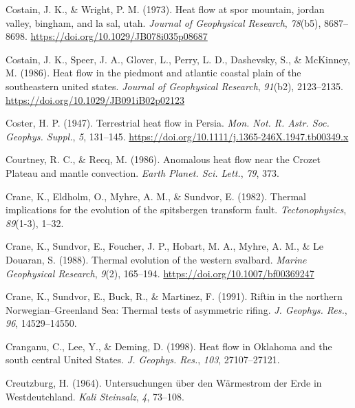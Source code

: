 \begin{CSLReferences}{1}{1}
\leavevmode{}%
Costain, J. K., \& Wright, P. M. (1973). Heat flow at spor mountain, jordan valley, bingham, and la sal, utah. \emph{Journal of Geophysical Research}, \emph{78}(b5), 8687--8698. \url{https://doi.org/10.1029/JB078i035p08687}

\leavevmode{}%
Costain, J. K., Speer, J. A., Glover, L., Perry, L. D., Dashevsky, S., \& McKinney, M. (1986). Heat flow in the piedmont and atlantic coastal plain of the southeastern united states. \emph{Journal of Geophysical Research}, \emph{91}(b2), 2123--2135. \url{https://doi.org/10.1029/JB091iB02p02123}

\leavevmode{}%
Coster, H. P. (1947). Terrestrial heat flow in {Persia}. \emph{Mon. Not. R. Astr. Soc. Geophys. Suppl.}, \emph{5}, 131--145. \url{https://doi.org/10.1111/j.1365-246X.1947.tb00349.x}

\leavevmode{}%
Courtney, R. C., \& Recq, M. (1986). Anomalous heat flow near the {Crozet Plateau} and mantle convection. \emph{Earth Planet. Sci. Lett.}, \emph{79}, 373.

\leavevmode{}%
Crane, K., Eldholm, O., Myhre, A. M., \& Sundvor, E. (1982). Thermal implications for the evolution of the spitsbergen transform fault. \emph{Tectonophysics}, \emph{89}(1-3), 1--32.

\leavevmode{}%
Crane, K., Sundvor, E., Foucher, J. P., Hobart, M. A., Myhre, A. M., \& Le Douaran, S. (1988). Thermal evolution of the western svalbard. \emph{Marine Geophysical Research}, \emph{9}(2), 165--194. \url{https://doi.org/10.1007/bf00369247}

\leavevmode{}%
Crane, K., Sundvor, E., Buck, R., \& Martinez, F. (1991). Riftin in the northern {Norwegian--Greenland Sea}: Thermal tests of asymmetric rifing. \emph{J. Geophys. Res.}, \emph{96}, 14529--14550.

\leavevmode{}%
Cranganu, C., Lee, Y., \& Deming, D. (1998). Heat flow in {Oklahoma} and the south central {United States}. \emph{J. Geophys. Res.}, \emph{103}, 27107--27121.

\leavevmode{}%
Creutzburg, H. (1964). Untersuchungen über den {Wärmestrom} der {Erde in Westdeutchland}. \emph{Kali Steinsalz}, \emph{4}, 73--108.


\end{CSLReferences}
